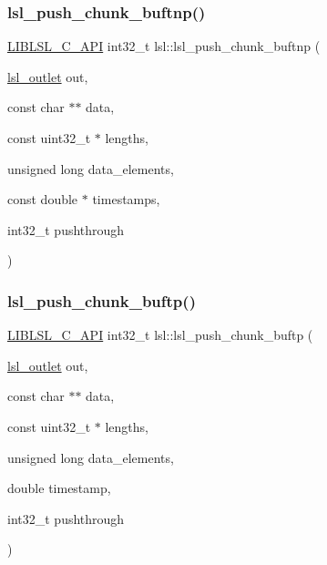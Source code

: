 \mbox{\label{namespacelsl_a231f423627ce9752d7877dfacf096b0f}} 
\subsubsection{\texorpdfstring{lsl\+\_\+push\+\_\+chunk\+\_\+buftnp()}{lsl\_push\_chunk\_buftnp()}}
{\footnotesize\ttfamily \hyperlink{lsl__cpp_8h_aafd0ef1813e8be84a1420c4f1df64615}{L\+I\+B\+L\+S\+L\+\_\+\+C\+\_\+\+A\+PI} int32\+\_\+t lsl\+::lsl\+\_\+push\+\_\+chunk\+\_\+buftnp (\begin{DoxyParamCaption}\item[{\hyperlink{namespacelsl_abcf512b0f66dacf86c10b165995fd50b}{lsl\+\_\+outlet}}]{out,  }\item[{const char $\ast$$\ast$}]{data,  }\item[{const uint32\+\_\+t $\ast$}]{lengths,  }\item[{unsigned long}]{data\+\_\+elements,  }\item[{const double $\ast$}]{timestamps,  }\item[{int32\+\_\+t}]{pushthrough }\end{DoxyParamCaption})}

\mbox{\label{namespacelsl_ab45337e9fc47d0517a6250e2e6931d38}} 
\subsubsection{\texorpdfstring{lsl\+\_\+push\+\_\+chunk\+\_\+buftp()}{lsl\_push\_chunk\_buftp()}}
{\footnotesize\ttfamily \hyperlink{lsl__cpp_8h_aafd0ef1813e8be84a1420c4f1df64615}{L\+I\+B\+L\+S\+L\+\_\+\+C\+\_\+\+A\+PI} int32\+\_\+t lsl\+::lsl\+\_\+push\+\_\+chunk\+\_\+buftp (\begin{DoxyParamCaption}\item[{\hyperlink{namespacelsl_abcf512b0f66dacf86c10b165995fd50b}{lsl\+\_\+outlet}}]{out,  }\item[{const char $\ast$$\ast$}]{data,  }\item[{const uint32\+\_\+t $\ast$}]{lengths,  }\item[{unsigned long}]{data\+\_\+elements,  }\item[{double}]{timestamp,  }\item[{int32\+\_\+t}]{pushthrough }\end{DoxyParamCaption})}

